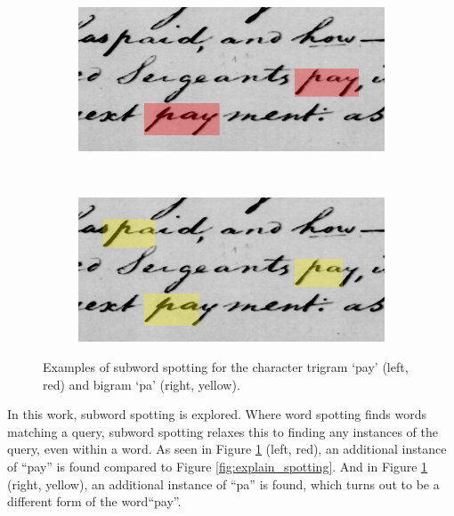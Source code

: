 \documentclass[ms,electronic,twosidetoc,letterpaper,chaptercenter,parttop,lof,lot]{byumsphd}
\begin{document}
\begin{figure}[t]
    \begin{subfigure}{0.46\textwidth}
    		\centering
    		\includegraphics[width=\textwidth]{spotting_explination_sub_pay}
    	\end{subfigure}
    	~
    	\begin{subfigure}{0.46\textwidth}
    		\centering
    		\includegraphics[width=\textwidth]{spotting_explination_sub_pa}
    	\end{subfigure}
    	\caption{Examples of subword spotting for the character trigram `pay' (left, red) and bigram `pa' (right, yellow).}
    	\label{fig:explain_sub_spotting}
\end{figure}

In this work, subword spotting is explored. Where word spotting finds words matching a query, subword spotting relaxes this to finding any instances of the query, even within a word. As seen in Figure \ref{fig:explain_sub_spotting} (left, red), an additional instance of ``pay'' is found compared to Figure \ref{fig:explain_spotting}.
And in Figure \ref{fig:explain_sub_spotting} (right, yellow), an additional instance of ``pa'' is found, which turns out to be a different form of the word``pay''.
\end{document}
